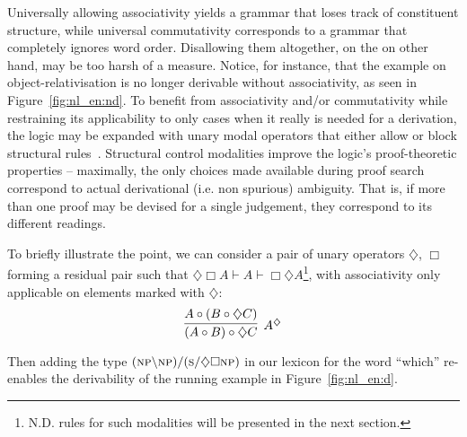 Universally allowing associativity yields a grammar that loses track of constituent structure, while universal commutativity corresponds to a grammar that completely ignores word order. 
Disallowing them altogether, on the on other hand, may be too harsh of a measure.
Notice, for instance, that the example on object-relativisation is no longer derivable without associativity, as seen in Figure~\ref{fig:nl_en:nd}.
To benefit from associativity and/or commutativity while restraining its applicability to only cases when it really is needed for a derivation, the logic may be expanded with unary modal operators that either allow or block structural rules~\cite{kurtonina1997structural}.
Structural control modalities improve the logic's proof-theoretic properties -- maximally, the only choices made available during proof search correspond to actual derivational (i.e. non spurious) ambiguity.
That is, if more than one proof may be devised for a single judgement, they correspond to its different readings.

To briefly illustrate the point, we can consider a pair of unary operators $\diamondsuit$, $\Box$ forming a residual pair such that $\diamondsuit \Box A \vdash A \vdash \Box \diamondsuit A$\footnote{N.D. rules for such modalities will be presented in the next section.}, with associativity only applicable on elements marked with $\diamondsuit$:
\[
\infer[A^{\diamondsuit}]{(A\circ B) \circ \diamondsuit C}{A \circ (B \circ \diamondsuit C)}
\] 

Then adding the type $(\textsc{np} \backslash \textsc{np}) / (\textsc{s}/\diamondsuit \Box \textsc{np})$ in our lexicon for the word ``which'' re-enables the derivability of the running example in Figure~\ref{fig:nl_en:d}.

